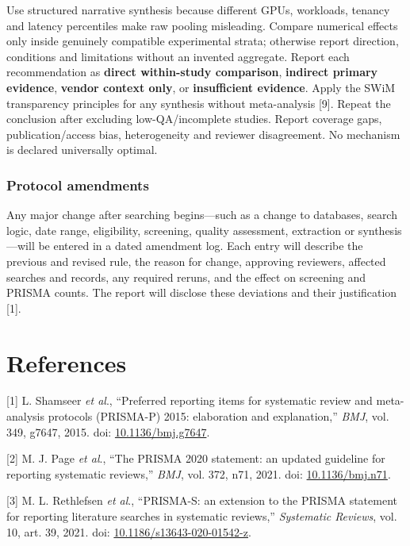 \documentclass[
  12pt,
]{article}
\begin{document}
Use structured narrative synthesis because different GPUs, workloads,
tenancy and latency percentiles make raw pooling misleading. Compare
numerical effects only inside genuinely compatible experimental strata;
otherwise report direction, conditions and limitations without an
invented aggregate. Report each recommendation as \textbf{direct
within-study comparison}, \textbf{indirect primary evidence},
\textbf{vendor context only}, or \textbf{insufficient evidence}. Apply
the SWiM transparency principles for any synthesis without meta-analysis
{[}9{]}. Repeat the conclusion after excluding low-QA/incomplete
studies. Report coverage gaps, publication/access bias, heterogeneity
and reviewer disagreement. No mechanism is declared universally optimal.

\hypertarget{protocol-amendments}{%
\subsubsection{Protocol amendments}\label{protocol-amendments}}

Any major change after searching begins---such as a change to databases,
search logic, date range, eligibility, screening, quality assessment,
extraction or synthesis---will be entered in a dated amendment log. Each
entry will describe the previous and revised rule, the reason for
change, approving reviewers, affected searches and records, any required
reruns, and the effect on screening and PRISMA counts. The report will
disclose these deviations and their justification {[}1{]}.

\hypertarget{references}{%
\section{References}\label{references}}

{[}1{]} L. Shamseer \emph{et al}., ``Preferred reporting items for
systematic review and meta-analysis protocols (PRISMA-P) 2015:
elaboration and explanation,'' \emph{BMJ}, vol. 349, g7647, 2015. doi:
\href{https://doi.org/10.1136/bmj.g7647}{10.1136/bmj.g7647}.

{[}2{]} M. J. Page \emph{et al}., ``The PRISMA 2020 statement: an
updated guideline for reporting systematic reviews,'' \emph{BMJ}, vol.
372, n71, 2021. doi:
\href{https://doi.org/10.1136/bmj.n71}{10.1136/bmj.n71}.

{[}3{]} M. L. Rethlefsen \emph{et al}., ``PRISMA-S: an extension to the
PRISMA statement for reporting literature searches in systematic
reviews,'' \emph{Systematic Reviews}, vol. 10, art. 39, 2021. doi:
\href{https://doi.org/10.1186/s13643-020-01542-z}{10.1186/s13643-020-01542-z}.
\end{document}
